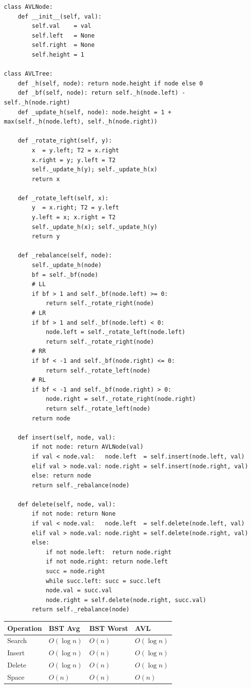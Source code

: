 \documentclass[11pt,a4paper]{report}
\begin{document}
\begin{lstlisting}
class AVLNode:
    def __init__(self, val):
        self.val    = val
        self.left   = None
        self.right  = None
        self.height = 1

class AVLTree:
    def _h(self, node): return node.height if node else 0
    def _bf(self, node): return self._h(node.left) - self._h(node.right)
    def _update_h(self, node): node.height = 1 + max(self._h(node.left), self._h(node.right))

    def _rotate_right(self, y):
        x  = y.left; T2 = x.right
        x.right = y; y.left = T2
        self._update_h(y); self._update_h(x)
        return x

    def _rotate_left(self, x):
        y  = x.right; T2 = y.left
        y.left = x; x.right = T2
        self._update_h(x); self._update_h(y)
        return y

    def _rebalance(self, node):
        self._update_h(node)
        bf = self._bf(node)
        # LL
        if bf > 1 and self._bf(node.left) >= 0:
            return self._rotate_right(node)
        # LR
        if bf > 1 and self._bf(node.left) < 0:
            node.left = self._rotate_left(node.left)
            return self._rotate_right(node)
        # RR
        if bf < -1 and self._bf(node.right) <= 0:
            return self._rotate_left(node)
        # RL
        if bf < -1 and self._bf(node.right) > 0:
            node.right = self._rotate_right(node.right)
            return self._rotate_left(node)
        return node

    def insert(self, node, val):
        if not node: return AVLNode(val)
        if val < node.val:   node.left  = self.insert(node.left, val)
        elif val > node.val: node.right = self.insert(node.right, val)
        else: return node
        return self._rebalance(node)

    def delete(self, node, val):
        if not node: return None
        if val < node.val:   node.left  = self.delete(node.left, val)
        elif val > node.val: node.right = self.delete(node.right, val)
        else:
            if not node.left:  return node.right
            if not node.right: return node.left
            succ = node.right
            while succ.left: succ = succ.left
            node.val = succ.val
            node.right = self.delete(node.right, succ.val)
        return self._rebalance(node)
\end{lstlisting}

\begin{compbox}
\begin{tabular}{@{}llll@{}}
\toprule
\textbf{Operation} & \textbf{BST Avg} & \textbf{BST Worst} & \textbf{AVL} \\
\midrule
Search  & $O(\log n)$ & $O(n)$ & $O(\log n)$ \\
Insert  & $O(\log n)$ & $O(n)$ & $O(\log n)$ \\
Delete  & $O(\log n)$ & $O(n)$ & $O(\log n)$ \\
Space   & $O(n)$ & $O(n)$ & $O(n)$ \\
\bottomrule
\end{tabular}
\end{compbox}
\end{document}
